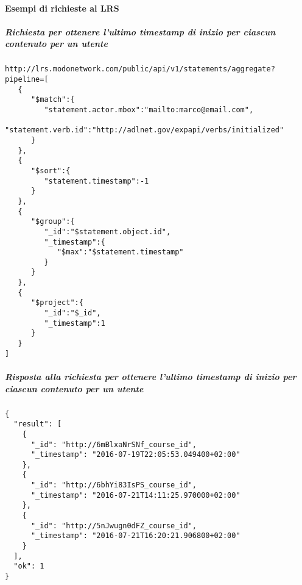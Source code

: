 \paragraph{Esempi di richieste al LRS}
    \subparagraph*{Richiesta per ottenere l'ultimo timestamp di inizio per ciascun contenuto per un utente}
    \hfill \break
    \begin{lstlisting}
http://lrs.modonetwork.com/public/api/v1/statements/aggregate?pipeline=[
   {
      "$match":{
         "statement.actor.mbox":"mailto:marco@email.com",
         "statement.verb.id":"http://adlnet.gov/expapi/verbs/initialized"
      }
   },
   {
      "$sort":{
         "statement.timestamp":-1
      }
   },
   {
      "$group":{
         "_id":"$statement.object.id",
         "_timestamp":{
            "$max":"$statement.timestamp"
         }
      }
   },
   {
      "$project":{
         "_id":"$_id",
         "_timestamp":1
      }
   }
]
    \end{lstlisting}
    \subparagraph*{Risposta alla richiesta per ottenere l'ultimo timestamp di inizio per ciascun contenuto per un utente}\hfill \break
    \begin{lstlisting}
{
  "result": [
    {
      "_id": "http://6mBlxaNrSNf_course_id",
      "_timestamp": "2016-07-19T22:05:53.049400+02:00"
    },
    {
      "_id": "http://6bhYi83IsPS_course_id",
      "_timestamp": "2016-07-21T14:11:25.970000+02:00"
    },
    {
      "_id": "http://5nJwugn0dFZ_course_id",
      "_timestamp": "2016-07-21T16:20:21.906800+02:00"
    }
  ],
  "ok": 1
}
    \end{lstlisting}

